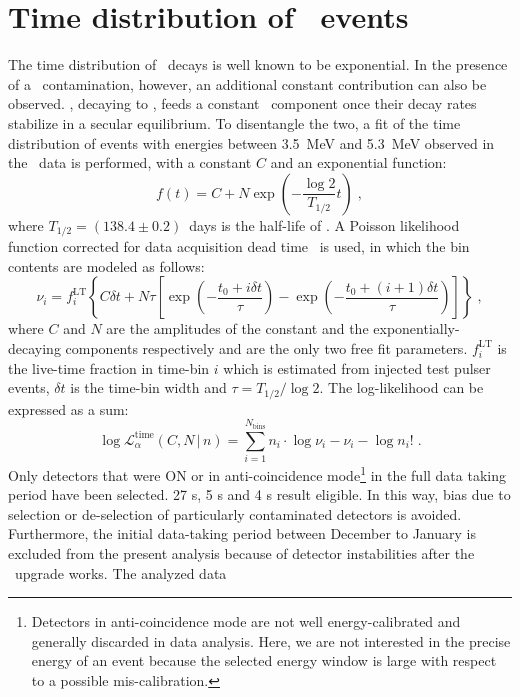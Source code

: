 
\chapter{\texorpdfstring{Time distribution of \a\ events}{Time distribution of alpha-events}}%
\label{apdx:timealpha}

The time distribution of \Po\ decays is well known to be exponential. In the presence of a
\Pbl\ contamination, however, an additional constant contribution can also be observed.
\Pbl, decaying to \Po, feeds a constant \Po\ component once their decay rates stabilize in
a secular equilibrium. To disentangle the two, a fit of the time distribution of events
with energies between 3.5~MeV and 5.3~MeV observed in the \gerda\ data is performed, with
a constant $C$ and an exponential function:
\[
  f(t) = C + N \exp\left( - \frac{\log2}{T_{1/2}}t \right) \;,
\]
where $T_{1/2}=(138.4\pm0.2)$~days is the half-life of \Po. A Poisson likelihood function
corrected for data acquisition dead time~\cite{Cleveland1983} is used, in which the bin
contents are modeled as follows:
\[
  \nu_i = f_i^{\mathrm{LT}}
  \left\{ C \delta t + N \tau
    \left[
      \exp\left( -\frac{t_0 + i \delta t}{\tau} \right)  -
      \exp\left( -\frac{t_0 + (i+1) \delta t}{\tau} \right)
    \right]
  \right\} \;,
\]
where $C$ and $N$ are the amplitudes of the constant and the exponentially-decaying
components respectively and are the only two free fit parameters.  $f_i^{\mathrm{LT}}$ is
the live-time fraction in time-bin $i$ which is estimated from injected test pulser
events, $\delta t$ is the time-bin width and $\tau = T_{1/2} / \log2$.
\newpar
The log-likelihood can be expressed as a sum:
\[
  \log \mathcal{L}_\alpha^\text{time}(C,N \,|\, n) =
  \sum_{i=1}^{N_\text{bins}} n_i \cdot
  \log\nu_i - \nu_i - \log n_i! \;.
\]
Only detectors that were ON or in anti-coincidence mode\footnote{%
  Detectors in anti-coincidence mode are not well energy-calibrated and generally
  discarded in data analysis. Here, we are not interested in the precise energy of an
  event because the selected energy window is large with respect to a possible
  mis-calibration.
} in the full data taking period have been selected. 27 \bege{}s, 5 \scoax{}s and 4
\icoax{}s result eligible. In this way, bias due to selection or de-selection of
particularly contaminated detectors is avoided. Furthermore, the initial data-taking
period between December  to January  is excluded from the present analysis
because of detector instabilities after the \phasetwo\ upgrade works. The analyzed data

